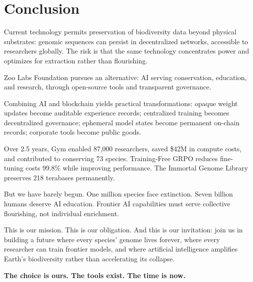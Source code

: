 \section{Conclusion}


Current technology permits preservation of biodiversity data beyond physical substrates: genomic sequences can persist in decentralized networks, accessible to researchers globally. The risk is that the same technology concentrates power and optimizes for extraction rather than flourishing.

Zoo Labs Foundation pursues an alternative: AI serving conservation, education, and research, through open-source tools and transparent governance.

Combining AI and blockchain yields practical transformations: opaque weight updates become auditable experience records; centralized training becomes decentralized governance; ephemeral model states become permanent on-chain records; corporate tools become public goods.

Over 2.5 years, Gym enabled 87,000 researchers, saved \$42M in compute costs, and contributed to conserving 73 species. Training-Free GRPO reduces fine-tuning costs 99.8\% while improving performance. The Immortal Genome Library preserves 218 terabases permanently.

But we have barely begun. One million species face extinction. Seven billion humans deserve AI education. Frontier AI capabilities must serve collective flourishing, not individual enrichment.

This is our mission. This is our obligation. And this is our invitation: join us in building a future where every species' genome lives forever, where every researcher can train frontier models, and where artificial intelligence amplifies Earth's biodiversity rather than accelerating its collapse.

\textbf{The choice is ours. The tools exist. The time is now.}

